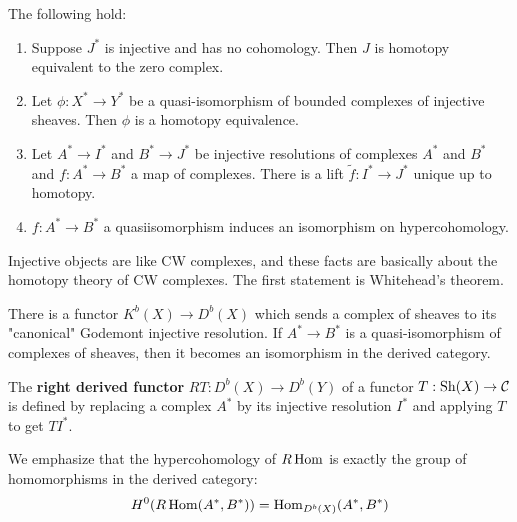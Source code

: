 \begin{corollary}
The following hold:
\begin{enumerate}
    \item Suppose $J^*$ is injective and has no cohomology. Then $J$ 
    is homotopy equivalent to the zero complex.
    \item Let $\phi:X^*\to Y^*$ be a quasi-isomorphism of bounded complexes of injective sheaves. 
    Then $\phi$ is a homotopy equivalence.
    \item Let $A^*\to I^*$ and $B^*\to J^*$ be injective resolutions of complexes $A^*$ 
    and $B^*$ and $f:A^*\to B^*$ a map of complexes. There is a lift 
    $\tilde f:I^*\to J^*$ unique up to homotopy.
    \item $f:A^*\to B^*$ a quasiisomorphism induces an isomorphism on hypercohomology.
\end{enumerate} 

\begin{remark}
    Injective objects are like CW complexes, and these facts are basically about 
    the homotopy theory of CW complexes. The first statement is Whitehead's theorem.
\end{remark}
There is a functor $K^b(X) \to D^b(X)$ which sends a complex of sheaves 
to its "canonical" Godemont injective resolution. If $A^* \to B^*$
is a quasi-isomorphism of complexes of sheaves, then it becomes 
an isomorphism in the derived category.

\begin{definition}
    The \textbf{right derived functor} $RT: D^b(X) \to D^b(Y)$ of a functor 
    $T:\operatorname{Sh}(X)\to {\mathcal{C}}$ is defined by replacing a complex $A^*$ 
    by its injective resolution $I^*$ and applying $T$ to get $TI^*$.
\end{definition}

\begin{remark}
    We emphasize that the hypercohomology of $R\operatorname{Hom}$ is exactly the group of 
    homomorphisms in the derived category: \begin{align*}
        H^0(R\operatorname{Hom}(A^*,B^*)) = \operatorname{Hom}_{D^b(X)}(A^*,B^*)
    \end{align*}
\end{remark}


\end{corollary}
